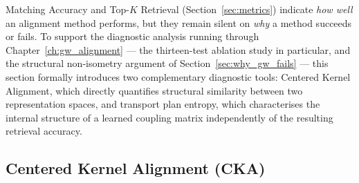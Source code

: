 Matching Accuracy and Top-$K$ Retrieval (Section~\ref{sec:metrics}) indicate \emph{how well} an alignment method performs, but they remain silent on \emph{why} a method succeeds or fails. To support the diagnostic analysis running through Chapter~\ref{ch:gw_alignment} --- the thirteen-test ablation study in particular, and the structural non-isometry argument of Section~\ref{sec:why_gw_fails} --- this section formally introduces two complementary diagnostic tools: Centered Kernel Alignment, which directly quantifies structural similarity between two representation spaces, and transport plan entropy, which characterises the internal structure of a learned coupling matrix independently of the resulting retrieval accuracy.

\subsection{Centered Kernel Alignment (CKA)}
\label{subsec:cka_definition}

